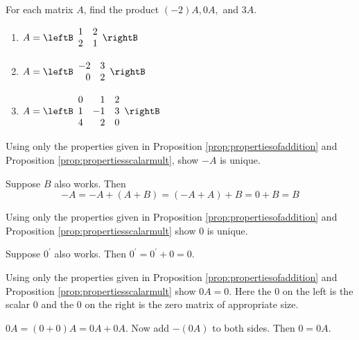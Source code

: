 \begin{enumialphparenastyle}

\begin{ex} For each matrix $A$, find the product $(-2)A, 0A,$ and $3A$. 
\begin{enumerate}
\item
$A = \leftB \begin{array}{rr}
1 & 2 \\
2 & 1 
\end{array} \rightB$

\item
$A = \leftB \begin{array}{rr}
-2 & 3 \\
0 & 2 
\end{array} \rightB$

\item
$A = \leftB \begin{array}{rrr}
0 & 1 & 2 \\
1 & -1 & 3 \\
4 & 2 & 0 
\end{array} \rightB$
\end{enumerate}
\end{ex}

\begin{ex} \label{addinvrstunique} Using only the properties given in Proposition \ref{prop:propertiesofaddition}
 and Proposition \ref{prop:propertiesscalarmult}, 
show $-A$ is unique.
\begin{sol}
 Suppose $B$ also works. Then
\[
-A=-A+\left( A+B\right) =\left( -A+A\right) +B=0+B=B
\]
\end{sol}
\end{ex}

\begin{ex} Using only the properties given in Proposition \ref{prop:propertiesofaddition} 
and Proposition \ref{prop:propertiesscalarmult}
show $0$ is unique. 
\begin{sol}
Suppose $0^{\prime }$ also works. Then $0^{\prime }=0^{\prime }+0=0.$
\end{sol}
\end{ex}

\begin{ex} Using only the properties given in Proposition \ref{prop:propertiesofaddition}
 and Proposition \ref{prop:propertiesscalarmult} show $0A=0.$ Here
the $0$ on the left is the scalar $0$ and the $0$ on the right is the zero matrix of appropriate size.
\begin{sol}
$0A=\left( 0+0\right) A=0A+0A.$ Now add $-\left(
0A\right) $ to both sides. Then $0=0A$.
\end{sol}
\end{ex}


\end{enumialphparenastyle}
